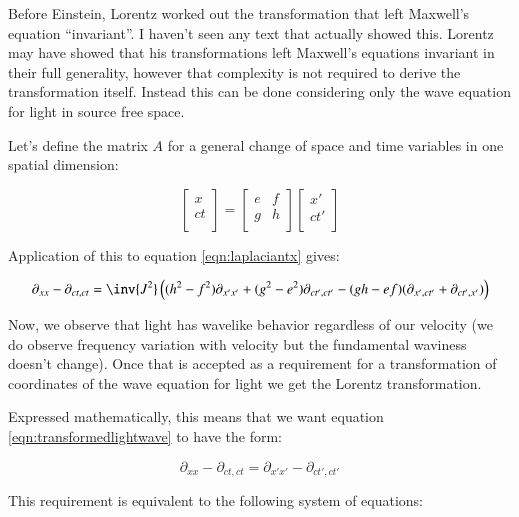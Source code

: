 \documentclass{article}      %
\begin{document}
Before Einstein, Lorentz worked out the transformation that left Maxwell's equation ``invariant''.  I haven't seen 
any text that actually showed this.  Lorentz may have showed that his transformations left Maxwell's equations 
invariant in their full generality, however that complexity is not required to derive the transformation itself.  Instead
this can be done considering only the wave equation for light in source free space.

Let's define the matrix $A$ for a general change of space and time variables in one spatial dimension:

\begin{equation}
\begin{bmatrix}
x \\
ct \\
\end{bmatrix}
=
\begin{bmatrix}
e & f \\
g & h \\
\end{bmatrix}
\begin{bmatrix}
x' \\
c t' \\
\end{bmatrix}
\end{equation}

Application of this to equation \ref{eqn:laplaciantx} gives:

\begin{equation}\label{eqn:transformedlightwave}
\partial_{xx} -\partial_{ct,ct} =
\inv{J^2} 
\left(
(h^2 - f^2)\partial_{x'x'} 
+(g^2 - e^2)\partial_{ct',ct'} 
-(g h - e f)( \partial_{x',ct'} + \partial_{ct',x'}  )
\right)
\end{equation}

Now, we observe that light has wavelike behavior regardless of our velocity (we do observe frequency variation with 
velocity but the fundamental waviness doesn't change).  Once that is accepted as a requirement for a transformation
of coordinates of the wave equation for light we get the Lorentz transformation.  

Expressed mathematically, this means that we want equation \ref{eqn:transformedlightwave} to have the form:

\begin{equation}
\partial_{xx} -\partial_{ct,ct} = \partial_{x'x'} -\partial_{ct',ct'}
\end{equation}

This requirement is equivalent to the following system of equations:
\end{document}
